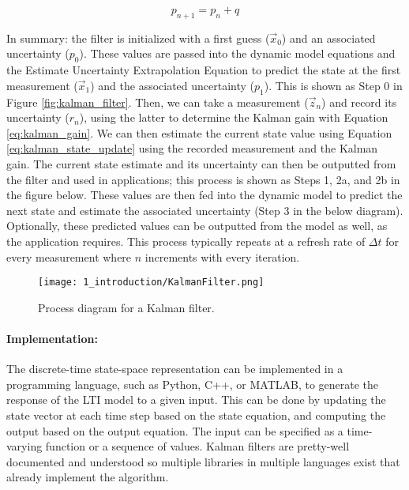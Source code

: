 
\begin{equation}
    p_{n+1} = p_n + q
\end{equation}

In summary: the filter is initialized with a first guess ($\vec{x}_{0}$) and an associated uncertainty ($p_{0}$). 
These values are passed into the dynamic model equations and the Estimate Uncertainty Extrapolation Equation to predict the state at the first measurement ($\vec{x}_{1}$) and the associated uncertainty ($p_{1}$).
This is shown as Step 0 in Figure \ref{fig:kalman_filter}.
Then, we can take a measurement ($\vec{z}_n$) and record its uncertainty ($r_n$), using the latter to determine the Kalman gain with Equation \ref{eq:kalman_gain}.
We can then estimate the current state value using Equation \ref{eq:kalman_state_update} using the recorded measurement and the Kalman gain.
The current state estimate and its uncertainty can then be outputted from the filter and used in applications; this process is shown as Steps 1, 2a, and 2b in the figure below.
These values are then fed into the dynamic model to predict the next state and estimate the associated uncertainty (Step 3 in the below diagram).
Optionally, these predicted values can be outputted from the model as well, as the application requires.
This process typically repeats at a refresh rate of $\Delta t$ for every measurement where $n$ increments with every iteration.

\begin{figure*}[h!]
    \texttt{[image: 1\_introduction/KalmanFilter.png]}
    \caption[Kalman Filter Diagram]{Process diagram for a Kalman filter.}
\end{figure*}

\paragraph{Implementation:} The discrete-time state-space representation can be implemented in a programming language, such as Python, C++, or MATLAB, to generate the response of the LTI model to a given input. 
This can be done by updating the state vector at each time step based on the state equation, and computing the output based on the output equation. The input can be specified as a time-varying function or a sequence of values.
Kalman filters are pretty-well documented and understood so multiple libraries in multiple languages exist that already implement the algorithm.

